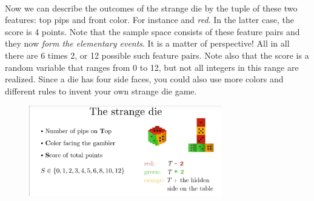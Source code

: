 \documentclass[12pt, a4paper]{scrartcl}
\begin{document}
\\

Now we can describe the outcomes of the strange die by the tuple of these two features: top pips and front color. For instance  and \textit{red}. In the latter case, the score is 4 points.
Note that the sample space consists of these feature pairs and they now \textit{form the elementary events}. It is a matter of perspective!
All in all there are 6 times 2, or 12 possible such feature pairs.
Note also that the score is a random variable that ranges from 0 to 12, but not all integers in this range are realized. 
Since a die has four side faces, you could also use more colors and different rules to invent your own strange die game.\\
\begin{figure}[H]
	\centering
	\includegraphics[width=0.75\textwidth]{3_2.png}
\end{figure}
\\
\end{document}
